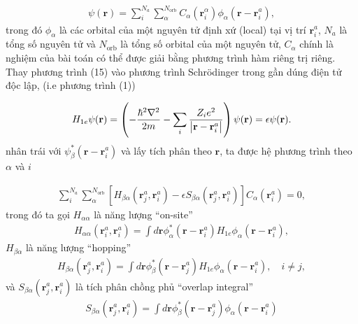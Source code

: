 \documentclass{article}
\newcommand{\dps}{\displaystyle}
\begin{document}
\begin{gather}
	\psi(\mathbf{r}) = \sum_{i}^{N_{a}} \sum_{\alpha}^{N_{\text{orb}}} C_{\alpha}(\mathbf{r}_{i}^{\alpha}) \phi_{\alpha}(\mathbf{r} - \mathbf{r}_{i}^{a}),
\end{gather}
trong đó $\phi_{\alpha}$ là các orbital của một nguyên tử định xứ (local) tại vị trí $\mathbf{r}_{i}^{a}$, $N_{a}$ là tổng số nguyên tử và $N_{\text{orb}}$ là tổng số orbital của một nguyên tử, $C_{\alpha}$ chính là nghiệm của bài toán có thể được giải bằng phương trình hàm riêng trị riêng. Thay phương trình (15) vào phương trình Schr\"{o}dinger trong gần dúng điện tử độc lập, (i.e phương trình (1))

\begin{gather}
	H_{1e}\psi(\mathbf{r}) = \left(- \frac{\hbar^{2}\nabla^{2}}{2m} - \sum_{i} \frac{Z_{i} e^{2}}{\abs{\mathbf{r} - \mathbf{r}_{i}^{a}}} \right) \psi(\mathbf{r}) = \epsilon \psi(\mathbf{r}).
\end{gather}
nhân trái với $\psi_{\beta}^{*}(\mathbf{r} - \mathbf{r}_{i}^{a})$ và lấy tích phân theo $\mathbf{r}$, ta được hệ phương trình theo $\alpha$ và $i$

\begin{gather}
	\sum_{i}^{N_{a}} \sum_{\alpha}^{N_{\text{orb}}} \left[H_{\beta \alpha} (\mathbf{r}_{j}^{a}, \mathbf{r}_{i}^{a}) - \epsilon S_{\beta \alpha} (\mathbf{r}_{j}^{a}, \mathbf{r}_{i}^{a}) \right] C_{\alpha}(\mathbf{r}_{i}^{a}) = 0,
\end{gather}
trong đó ta gọi $H_{\alpha \alpha}$ là năng lượng ``on-site''
\begin{gather}
	H_{\alpha \alpha} (\mathbf{r}_{i}^{a}, \mathbf{r}_{i}^{a}) = \dps \int d\mathbf{r} \phi_{\alpha}^{*}(\mathbf{r} - \mathbf{r}_{i}^{a}) H_{1e} \phi_{\alpha}(\mathbf{r} - \mathbf{r}_{i}^{a}),
\end{gather}
$H_{\beta \alpha}$ là năng lượng ``hopping'' 
\begin{gather}
	H_{\beta \alpha} (\mathbf{r}_{j}^{a}, \mathbf{r}_{i}^{a}) = \dps \int d\mathbf{r} \phi_{\beta}^{*}(\mathbf{r} - \mathbf{r}_{j}^{a}) H_{1e} \phi_{\alpha}(\mathbf{r} - \mathbf{r}_{i}^{a}), \quad i \neq j,
\end{gather}
và $S_{\beta \alpha} (\mathbf{r}_{j}^{a}, \mathbf{r}_{i}^{a})$  là tích phân chồng phủ ``overlap integral''
\begin{gather}
	S_{\beta \alpha} (\mathbf{r}_{j}^{a}, \mathbf{r}_{i}^{a}) = \dps \int d\mathbf{r} \phi_{\beta}^{*}(\mathbf{r} - \mathbf{r}_{j}^{a}) \phi_{\alpha}(\mathbf{r} - \mathbf{r}_{i}^{a})
\end{gather}
\end{document}
